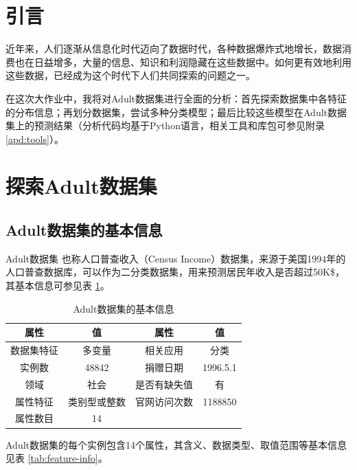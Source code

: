\documentclass[12pt,a4paper]{article}
\theoremstyle{definition}
\begin{document}
\section{引言}

近年来，人们逐渐从信息化时代迈向了数据时代，各种数据爆炸式地增长，数据消费也在日益增多，大量的信息、知识和利润隐藏在这些数据中。如何更有效地利用这些数据，已经成为这个时代下人们共同探索的问题之一。

\vspace{0.01\linewidth}
在这次大作业中，我将对Adult数据集进行全面的分析：首先探索数据集中各特征的分布信息；再划分数据集，尝试多种分类模型；最后比较这些模型在Adult数据集上的预测结果（分析代码均基于Python语言，相关工具和库包可参见附录 \ref{apd:tools}）。

\section{探索Adult数据集}

\subsection{Adult数据集的基本信息}

Adult数据集 \cite{Dataset} 也称人口普查收入（Census Income）数据集，来源于美国1994年的人口普查数据库，可以作为二分类数据集，用来预测居民年收入是否超过50K\$，其基本信息可参见表 \ref{tab:basic-info}。

\begin{table}[H]
	\renewcommand\arraystretch{1.35}
	\caption{Adult数据集的基本信息}
	\label{tab:basic-info}
	\centering
	
	\begin{tabular}{c|c||c|c}
		\centering
		属性 & 值 & 属性 & 值 \\
		\hline
		\hline
		数据集特征 & 多变量 & 相关应用 & 分类 \\
		实例数 & 48842 & 捐赠日期 & 1996.5.1 \\
		领域 & 社会 & 是否有缺失值 & 有 \\
		属性特征 & 类别型或整数 & 官网访问次数 & 1188850 \\
		属性数目 & 14 & & \\
		
	\end{tabular}
\end{table}

\vspace{-0.01\linewidth}
Adult数据集的每个实例包含14个属性，其含义、数据类型、取值范围等基本信息见表 \ref{tab:feature-info}。
\end{document}
